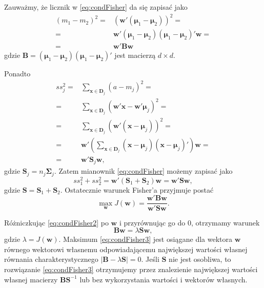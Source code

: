 \documentclass[
]{book}
\theoremstyle{plain}
\theoremstyle{definition}
\theoremstyle{definition}
\theoremstyle{definition}
\theoremstyle{definition}
\theoremstyle{remark}
\begin{document}
Zauważmy, że licznik w \eqref{eq:condFisher} da się zapisać jako
\begin{align}
    (m_1-m_2)^2=& ( \boldsymbol w'( \boldsymbol \mu_1- \boldsymbol \mu_2))^2=\\
    =& \boldsymbol w'(\boldsymbol \mu_1- \boldsymbol \mu_2)(\boldsymbol \mu_1- \boldsymbol \mu_2)'\boldsymbol w=\\
    =& \boldsymbol w' \boldsymbol B \boldsymbol w
\end{align}
gdzie \(\boldsymbol B=(\boldsymbol \mu_1- \boldsymbol \mu_2)(\boldsymbol \mu_1- \boldsymbol \mu_2)'\) jest macierzą \(d\times d\).

Ponadto
\begin{align}
    ss_j^2=&\sum_{ \boldsymbol x\in \boldsymbol D_j}(a-m_j)^2=\\
    =&\sum_{ \boldsymbol x\in \boldsymbol D_j}( \boldsymbol w' \boldsymbol x- \boldsymbol w' \boldsymbol\mu_j)^2=\\
    =& \sum_{ \boldsymbol x\in \boldsymbol D_j}( \boldsymbol{w}'( \boldsymbol{x}- \boldsymbol{\mu}_j))^2=\\
    =& \boldsymbol{w}'\left(\sum_{ \boldsymbol x\in \boldsymbol D_j}(\boldsymbol{x}-\boldsymbol \mu_j)(\boldsymbol x- \boldsymbol \mu_j)'\right) \boldsymbol{w}=\\
    =& \boldsymbol{w}' \boldsymbol{S}_j \boldsymbol{w},
    \label{eq:Sj}
\end{align}
gdzie \(\boldsymbol{S}_j=n_j \boldsymbol{\Sigma}_j\).
Zatem mianownik \eqref{eq:condFisher} możemy zapisać jako
\begin{equation}
    ss_1^2+ss_2^2= \boldsymbol{w}'(\boldsymbol{S}_1+ \boldsymbol{S}_2) \boldsymbol{w}= \boldsymbol{w}' \boldsymbol{S} \boldsymbol{w},
\end{equation}
gdzie \(\boldsymbol{S}=\boldsymbol{S}_1+\boldsymbol{S}_2\).
Ostatecznie warunek Fisher'a przyjmuje postać
\begin{equation}
    \max_{ \boldsymbol{w}}J( \boldsymbol{w})=\frac{ \boldsymbol{w}' \boldsymbol{B} \boldsymbol{w}}{ \boldsymbol{w}' \boldsymbol{S} \boldsymbol{w}}.
    \label{eq:condFisher2}
\end{equation}

Różniczkując \eqref{eq:condFisher2} po \(\boldsymbol{w}\) i przyrównując go do 0, otrzymamy warunek
\begin{equation}
    \boldsymbol{B} \boldsymbol{w} = \lambda \boldsymbol{S} \boldsymbol{w},
    \label{eq:condFisher3}
\end{equation}
gdzie \(\lambda=J(\boldsymbol{w})\). Maksimum \eqref{eq:condFisher3} jest osiągane dla wektora \(\boldsymbol{w}\) równego wektorowi własnemu odpowiadającemu największej wartości własnej równania charakterystycznego \(|\boldsymbol{B}-\lambda\boldsymbol{S}|=0\). Jeśli \(\boldsymbol{S}\) nie jest osobliwa, to rozwiązanie \eqref{eq:condFisher3} otrzymujemy przez znalezienie największej wartości własnej macierzy \(\boldsymbol{B}\boldsymbol{S}^{-1}\) lub bez wykorzystania wartości i wektorów własnych.
\end{document}

